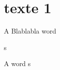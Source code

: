\documentclass{scrbook}
\begin{document}
\section{texte 1}
\beginnumbering
\pstart
A  Blablabla  word
\pend
\endnumbering

s

\beginnumbering
\pstart
A  word
\pend
\endnumbering
\leavevmode
s
\end{document}
